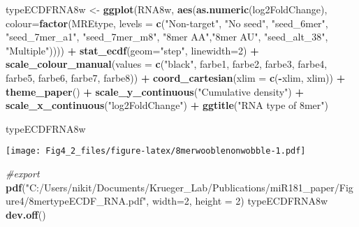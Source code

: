 \documentclass[
]{article}
\newenvironment{Shaded}{\begin{snugshade}}{\end{snugshade}}
\newcommand{\AttributeTok}[1]{\textcolor[rgb]{0.13,0.29,0.53}{#1}}
\newcommand{\CommentTok}[1]{\textcolor[rgb]{0.56,0.35,0.01}{\textit{#1}}}
\newcommand{\DecValTok}[1]{\textcolor[rgb]{0.00,0.00,0.81}{#1}}
\newcommand{\FunctionTok}[1]{\textcolor[rgb]{0.13,0.29,0.53}{\textbf{#1}}}
\newcommand{\NormalTok}[1]{#1}
\newcommand{\OtherTok}[1]{\textcolor[rgb]{0.56,0.35,0.01}{#1}}
\newcommand{\SpecialCharTok}[1]{\textcolor[rgb]{0.81,0.36,0.00}{\textbf{#1}}}
\newcommand{\StringTok}[1]{\textcolor[rgb]{0.31,0.60,0.02}{#1}}
\begin{document}
\begin{Shaded}
\begin{Highlighting}[]
\NormalTok{typeECDFRNA8w }\OtherTok{\textless{}{-}} \FunctionTok{ggplot}\NormalTok{(RNA8w, }\FunctionTok{aes}\NormalTok{(}\FunctionTok{as.numeric}\NormalTok{(log2FoldChange), }
                              \AttributeTok{colour=}\FunctionTok{factor}\NormalTok{(MREtype, }\AttributeTok{levels =} \FunctionTok{c}\NormalTok{(}\StringTok{"Non{-}target"}\NormalTok{, }\StringTok{"No seed"}\NormalTok{, }\StringTok{"seed\_6mer"}\NormalTok{, }\StringTok{"seed\_7mer\_a1"}\NormalTok{, }\StringTok{"seed\_7mer\_m8"}\NormalTok{, }\StringTok{"8mer AA"}\NormalTok{,}\StringTok{"8mer AU"}\NormalTok{, }\StringTok{"seed\_alt\_38"}\NormalTok{, }\StringTok{"Multiple"}\NormalTok{)))) }\SpecialCharTok{+} 
  \FunctionTok{stat\_ecdf}\NormalTok{(}\AttributeTok{geom=}\StringTok{"step"}\NormalTok{, }\AttributeTok{linewidth=}\DecValTok{2}\NormalTok{) }\SpecialCharTok{+}
  \FunctionTok{scale\_colour\_manual}\NormalTok{(}\AttributeTok{values =} \FunctionTok{c}\NormalTok{(}\StringTok{"black"}\NormalTok{, farbe1, farbe2, farbe3, farbe4, farbe5, farbe6, farbe7, farbe8)) }\SpecialCharTok{+}
  \FunctionTok{coord\_cartesian}\NormalTok{(}\AttributeTok{xlim =} \FunctionTok{c}\NormalTok{(}\SpecialCharTok{{-}}\NormalTok{xlim, xlim)) }\SpecialCharTok{+} 
  \FunctionTok{theme\_paper}\NormalTok{() }\SpecialCharTok{+}
  \FunctionTok{scale\_y\_continuous}\NormalTok{(}\StringTok{"Cumulative density"}\NormalTok{) }\SpecialCharTok{+} \FunctionTok{scale\_x\_continuous}\NormalTok{(}\StringTok{"log2FoldChange"}\NormalTok{) }\SpecialCharTok{+}
  \FunctionTok{ggtitle}\NormalTok{(}\StringTok{"RNA type of 8mer"}\NormalTok{)}

\NormalTok{typeECDFRNA8w}
\end{Highlighting}
\end{Shaded}

\texttt{[image: Fig4\_2\_files/figure-latex/8merwooblenonwobble-1.pdf]}

\begin{Shaded}
\begin{Highlighting}[]
\CommentTok{\#export}
\FunctionTok{pdf}\NormalTok{(}\StringTok{"C:/Users/nikit/Documents/Krueger\_Lab/Publications/miR181\_paper/Figure4/8mertypeECDF\_RNA.pdf"}\NormalTok{, }\AttributeTok{width=}\DecValTok{2}\NormalTok{, }\AttributeTok{height =} \DecValTok{2}\NormalTok{)}
\NormalTok{typeECDFRNA8w}
\FunctionTok{dev.off}\NormalTok{()}
\end{Highlighting}
\end{Shaded}
\end{document}

